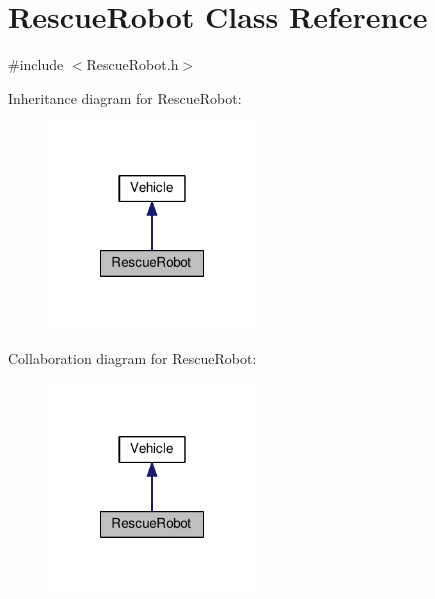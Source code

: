 \hypertarget{class_rescue_robot}{\section{Rescue\-Robot Class Reference}
\label{class_rescue_robot}
}


{\ttfamily \#include $<$Rescue\-Robot.\-h$>$}



Inheritance diagram for Rescue\-Robot\-:
\nopagebreak
\begin{figure}[H]
\begin{center}
\leavevmode
\includegraphics[width=156pt]{class_rescue_robot__inherit__graph}
\end{center}
\end{figure}


Collaboration diagram for Rescue\-Robot\-:
\nopagebreak
\begin{figure}[H]
\begin{center}
\leavevmode
\includegraphics[width=156pt]{class_rescue_robot__coll__graph}
\end{center}
\end{figure}
